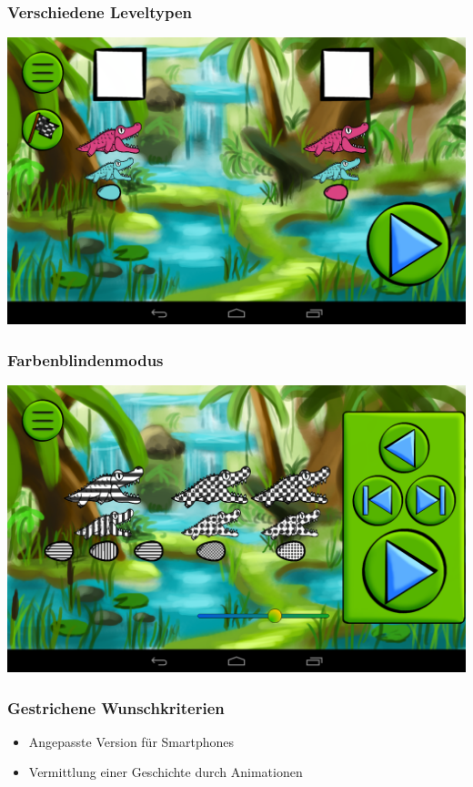 \documentclass[t]{beamer}
\begin{document}
\begin{frame}
	\frametitle{Verschiedene Leveltypen}
	\includegraphics[width=\textwidth]{images/screenshots/multiple_choice}
\end{frame}

\begin{frame}
	\frametitle{Farbenblindenmodus}
	\includegraphics[width=\textwidth]{images/screenshots/colorblind}
\end{frame}

\begin{frame}[c]
	\frametitle{Gestrichene Wunschkriterien}
	\begin{itemize}
		\item Angepasste Version für Smartphones
		\item Vermittlung einer Geschichte durch Animationen
	\end{itemize}
\end{frame}
\end{document}

